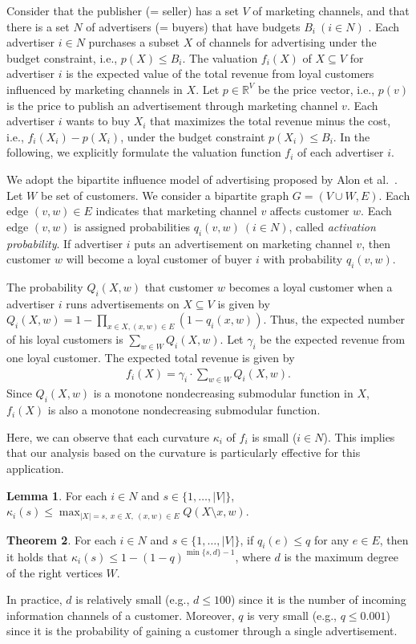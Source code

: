 \documentclass[letterpaper]{article}
\theoremstyle{definition}
\newtheorem{theorem}{Theorem}
\newtheorem{lemma}[theorem]{Lemma}
\begin{document}
Consider that the publisher (= seller) has a set $V$ of marketing channels, and that there is a set $N$ of advertisers (= buyers) that have budgets $B_i \ (i \in N)$ .
Each advertiser $i \in N$ purchases a subset $X$ of channels for advertising under the budget constraint, i.e., $p(X) \leq B_i$.
The valuation $f_i(X)$ of $X \subseteq V$ for advertiser $i$ is the expected value of the total revenue from loyal customers influenced by marketing channels in $X$.
Let $p \in \mathbb{R}^V$ be the price vector, i.e., $p(v)$ is the price to publish an advertisement through marketing channel $v$.
Each advertiser $i$ wants to buy $X_i$ that maximizes the total revenue minus the cost, i.e., $f_i(X_i) - p(X_i)$, under the budget constraint $p(X_i) \leq B_i$.
In the following, we explicitly formulate the valuation function $f_i$ of each advertiser $i$.

We adopt the bipartite influence model of advertising proposed by Alon et al.~\cite{alon2012optimizing}.
Let $W$ be set of customers.
We consider a bipartite graph $G = (V \cup W, E)$. Each edge $(v, w) \in E$ indicates that marketing channel $v$ affects customer $w$.
Each edge $(v,w)$ is assigned probabilities $q_i(v,w) \ (i \in N)$, called \emph{activation probability}.
If advertiser $i$ puts an advertisement on marketing channel $v$, then customer $w$ will become a loyal customer of buyer $i$ with probability $q_i(v,w)$.

The probability $Q_i(X,w)$ that customer $w$ becomes a loyal customer
when a advertiser $i$ runs advertisements on $X \subseteq V$ is given by
$Q_i(X, w) = 1 - \prod_{x \in X, (x,w) \in E}(1 - q_i(x,w))$.
Thus, the expected number of his loyal customers is $\sum_{w \in W} Q_i(X, w)$.
Let $\gamma_i$ be the expected revenue from one loyal customer.
The expected total revenue is given by
\begin{align}\label{eq:fQ}
\textstyle
f_i(X)=\gamma_i \cdot \sum_{w \in W} Q_i(X, w).
\end{align}
Since $Q_i(X, w)$ is a monotone nondecreasing submodular function in $X$,
$f_i(X)$ is also a monotone nondecreasing submodular function.



Here, we can observe that each curvature $\kappa_i$ of $f_i$ is small ($i \in N$).
This implies that our analysis based on the curvature is particularly effective for this application.
\begin{lemma}
\label{lem:curvaturebound}
For each $i \in N$ and $s \in \{1, \ldots, |V|\}$,
$\kappa_i(s) \le \max_{|X| = s,~ x \in X,~ (x,w) \in E} Q(X \setminus x, w)$.
\end{lemma}
\begin{theorem}
\label{thm:curvature}
For each $i \in N$ and $s \in \{1, \ldots, |V|\}$,
if $q_i(e) \le q$ for any $e \in E$, then
it holds that $\kappa_i(s) \le 1 - (1 - q)^{\min\{s,d\} - 1}$,
where $d$ is the maximum degree of the right vertices $W$.
\end{theorem}
In practice, $d$ is relatively small (e.g., $d \le 100$) since it is the number of incoming information channels of a customer.
Moreover, $q$ is very small (e.g., $q \le 0.001$) since it is the probability of gaining a customer through a single advertisement.
\end{document}
